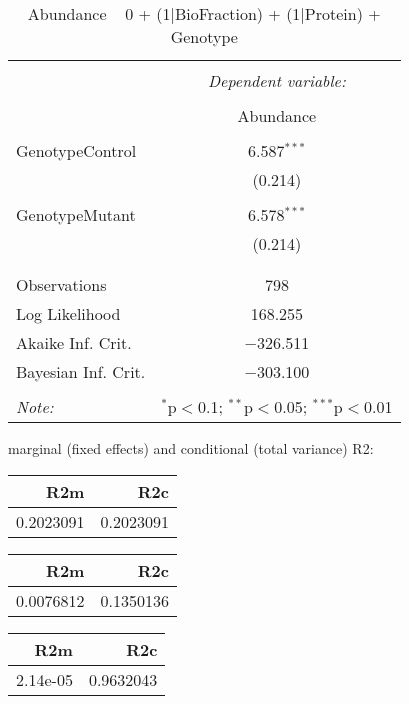 \documentclass[11pt]{report}
\begin{document}
\begin{table}[!htbp] \centering 
  \caption{Abundance ~ 0 + (1|BioFraction) + (1|Protein) + Genotype} 
  \label{} 
\begin{tabular}{@{\extracolsep{5pt}}lc} 
\\[-1.8ex]\hline 
\hline \\[-1.8ex] 
 & \multicolumn{1}{c}{\textit{Dependent variable:}} \\ 
\cline{2-2} 
\\[-1.8ex] & Abundance \\ 
\hline \\[-1.8ex] 
 GenotypeControl & 6.587$^{***}$ \\ 
  & (0.214) \\ 
  & \\ 
 GenotypeMutant & 6.578$^{***}$ \\ 
  & (0.214) \\ 
  & \\ 
\hline \\[-1.8ex] 
Observations & 798 \\ 
Log Likelihood & 168.255 \\ 
Akaike Inf. Crit. & $-$326.511 \\ 
Bayesian Inf. Crit. & $-$303.100 \\ 
\hline 
\hline \\[-1.8ex] 
\textit{Note:}  & \multicolumn{1}{r}{$^{*}$p$<$0.1; $^{**}$p$<$0.05; $^{***}$p$<$0.01} \\ 
\end{tabular} 
\end{table} 
marginal (fixed effects) and conditional (total variance) R2:

\begin{tabular}{r|r}
\hline
R2m & R2c\\
\hline
0.2023091 & 0.2023091\\
\hline
\end{tabular}

\begin{tabular}{r|r}
\hline
R2m & R2c\\
\hline
0.0076812 & 0.1350136\\
\hline
\end{tabular}

\begin{tabular}{r|r}
\hline
R2m & R2c\\
\hline
2.14e-05 & 0.9632043\\
\hline
\end{tabular}
\end{document}
